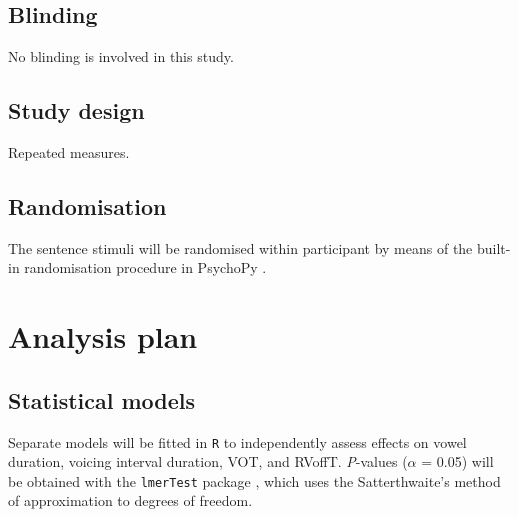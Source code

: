\documentclass[11pt,]{article}
\begin{document}
\hypertarget{blinding}{%
\subsection{Blinding}\label{blinding}}

No blinding is involved in this study.

\hypertarget{study-design}{%
\subsection{Study design}\label{study-design}}

Repeated measures.

\hypertarget{randomisation}{%
\subsection{Randomisation}\label{randomisation}}

The sentence stimuli will be randomised within participant by means of
the built-in randomisation procedure in PsychoPy \citep{peirce2009}.

\hypertarget{analysis-plan}{%
\section{Analysis plan}\label{analysis-plan}}

\hypertarget{statistical-models}{%
\subsection{Statistical models}\label{statistical-models}}

Separate models will be fitted in \texttt{R} to independently assess
effects on vowel duration, voicing interval duration, VOT, and RVoffT.
\emph{P}-values (\(\alpha\) = 0.05) will be obtained with the
\texttt{lmerTest} package \citep{kuznetsova2017}, which uses the
Satterthwaite's method of approximation to degrees of freedom.
\end{document}
